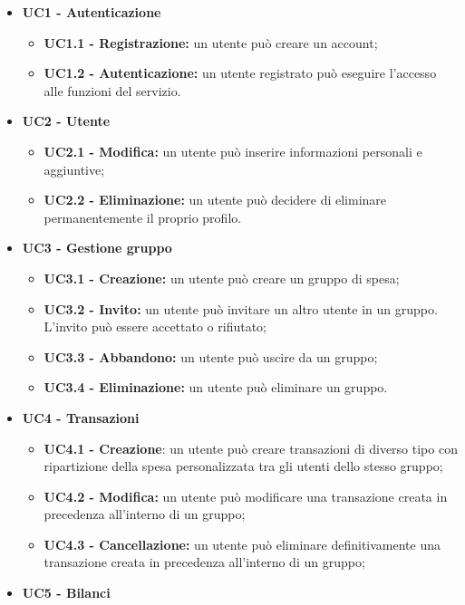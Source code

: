 \begin{itemize}
    \item \textbf{UC1 - Autenticazione}
    \begin{itemize}
        \item \textbf{UC1.1 - Registrazione:} un utente può creare un account;
        \item \textbf{UC1.2 - Autenticazione:} un utente registrato può eseguire l'accesso alle funzioni del servizio.
    \end{itemize}
    \item \textbf{UC2 - Utente}
    \begin{itemize}
        \item \textbf{UC2.1 - Modifica:} un utente può inserire informazioni personali e aggiuntive;
        \item \textbf{UC2.2 - Eliminazione:} un utente può decidere di eliminare permanentemente il proprio profilo.
    \end{itemize}
    \item \textbf{UC3 - Gestione gruppo}
    \begin{itemize}
        \item \textbf{UC3.1 - Creazione:} un utente può creare un gruppo di spesa;
        \item \textbf{UC3.2 - Invito:} un utente può invitare un altro utente in un gruppo. L'invito può essere accettato o rifiutato;
        \item \textbf{UC3.3 - Abbandono:} un utente può uscire da un gruppo;
        \item \textbf{UC3.4 - Eliminazione:} un utente può eliminare un gruppo.
    \end{itemize}
    \item \textbf{UC4 - Transazioni}
    \begin{itemize}
        \item \textbf{UC4.1 - Creazione}: un utente può creare transazioni di diverso tipo con ripartizione della spesa personalizzata tra gli utenti dello stesso gruppo;
        \item \textbf{UC4.2 - Modifica:} un utente può modificare una transazione creata in precedenza all'interno di un gruppo;
        \item \textbf{UC4.3 - Cancellazione:} un utente può eliminare definitivamente una transazione creata in precedenza all'interno di un gruppo;
    \end{itemize}
    \item \textbf{UC5 - Bilanci}
        \begin{itemize}

\end{itemize}
\end{itemize}
